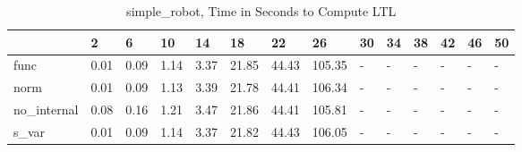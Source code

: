 \begin{table}
\caption{simple_robot, Time in Seconds to Compute LTL}
\label{simple_robot_LTL_time}
\begin{tabular}{llllllllllllll}
\toprule
 & 2 & 6 & 10 & 14 & 18 & 22 & 26 & 30 & 34 & 38 & 42 & 46 & 50 \\
\midrule
func & 0.01 & 0.09 & 1.14 & 3.37 & 21.85 & 44.43 & 105.35 & - & - & - & - & - & - \\
norm & 0.01 & 0.09 & 1.13 & 3.39 & 21.78 & 44.41 & 106.34 & - & - & - & - & - & - \\
no_internal & 0.08 & 0.16 & 1.21 & 3.47 & 21.86 & 44.41 & 105.81 & - & - & - & - & - & - \\
s_var & 0.01 & 0.09 & 1.14 & 3.37 & 21.82 & 44.43 & 106.05 & - & - & - & - & - & - \\
\bottomrule
\end{tabular}
\end{table}
